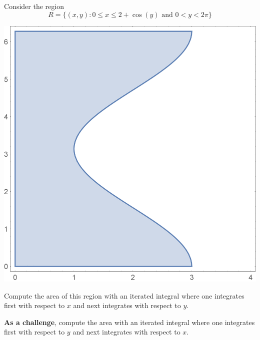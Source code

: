 \documentclass[handout,nooutcomes,noauthor]{ximera}
\begin{document}
\begin{problem}
  Consider the region
  \[
  R=\{(x,y):0\le x\le 2+\cos(y)\text{ and }0<y<2\pi\}
  \]
  \begin{image}[1.75in]
    \includegraphics{region.png}
  \end{image}
  Compute the area of this region with an iterated integral where one
  integrates first with respect to $x$ and next integrates with
  respect to $y$.
  
  \textbf{As a challenge}, compute the area with an iterated integral
  where one integrates first with respect to $y$ and next integrates
  with respect to $x$.
\end{problem}
\end{document}

